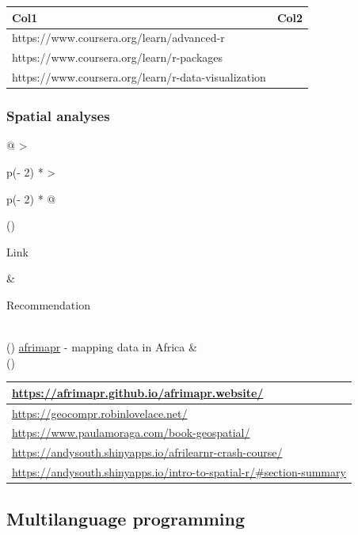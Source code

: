 \documentclass[
  letterpaper,
  DIV=11,
  numbers=noendperiod,
  oneside]{scrreprt}
\begin{document}
\begin{longtable}[]{@{}ll@{}}
\toprule()
Col1 & Col2 \\
\midrule()
\endhead
https://www.coursera.org/learn/advanced-r & \\
https://www.coursera.org/learn/r-packages & \\
https://www.coursera.org/learn/r-data-visualization & \\
\bottomrule()
\end{longtable}

\hypertarget{spatial-analyses}{%
\subsubsection{Spatial analyses}\label{spatial-analyses}}

\begin{longtable}[]{@{}
  >{\raggedright\arraybackslash}p{(\columnwidth - 2\tabcolsep) * }
  >{\raggedright\arraybackslash}p{(\columnwidth - 2\tabcolsep) * }@{}}
\toprule()
\begin{minipage}[b]{\linewidth}\raggedright
Link
\end{minipage} & \begin{minipage}[b]{\linewidth}\raggedright
Recommendation
\end{minipage} \\
\midrule()
\endhead
\href{https://afrimapr.github.io/afrimapr.website/training/}{afrimapr} -
mapping data in Africa & \\
\bottomrule()
\end{longtable}

\begin{longtable}[]{@{}l@{}}
\toprule()
\url{https://afrimapr.github.io/afrimapr.website/} \\
\midrule()
\endhead
\url{https://geocompr.robinlovelace.net/} \\
\url{https://www.paulamoraga.com/book-geospatial/} \\
\url{https://andysouth.shinyapps.io/afrilearnr-crash-course/} \\
\url{https://andysouth.shinyapps.io/intro-to-spatial-r/\#section-summary} \\
\bottomrule()
\end{longtable}

\hypertarget{multilanguage-programming}{%
\subsection{Multilanguage programming}\label{multilanguage-programming}}
\end{document}
